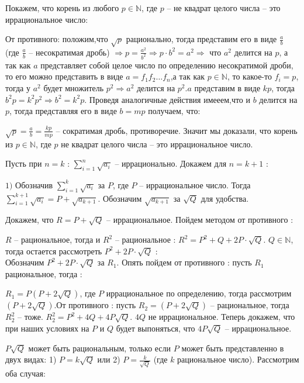 \documentclass[a4paper,14pt]{article} %
\begin{document}
Покажем, что корень из любого $p \in \mathbb{N}$, где $p$ -- не квадрат целого числа -- это иррациональное число:

От противного: положим,что $\sqrt{p}$ рационально, тогда представим его в виде $\frac{a}{b}$ (где $\frac{a}{b}$ -- несократимая дробь) $\Rightarrow p = \frac{a^2}{b^2} \Rightarrow p\cdot b^2 = a^2 \Rightarrow $ что $a^2$ делится на $p$, а так как $a$ представляет собой целое число по определению несократимой дроби, то его можно представить в виде $a = f_{1} f_{2}  \dots  f_{n}$,а так как $p \in \mathbb{N}$, то какое-то $f_{i} = p$, тогда у $a^2$ будет множитель $p^2 \Rightarrow a^2$ делится на $p^2$.$a$ представим в виде $kp$, тогда $b^2p = k^2p^2 \Rightarrow b^2=k^2p$. Проведя аналогичные действия имееем,что и $b$ делится на $p$, тогда  представляя его в виде $ b = mp$ получаем, что:

$ \sqrt{p} = \frac{a}{b} = \frac{kp}{mp}$ -- сократимая дробь, противоречие. Значит мы доказали, что корень из $p \in \mathbb{N}$, где $p$ не квадрат целого числа -- это иррациональное число.

Пусть при $n = k$ : $\sum\limits_{i=1}^{n} \sqrt{a_{i}}$ -- иррационально.
Докажем для $n = k + 1$ :

$1)$ Обозначив $\sum\limits_{i=1}^{k} \sqrt{a_{i}}$ за $P$, где $P$ -- иррациональное число. Тогда $\sum\limits_{i=1}^{k+1} \sqrt{a_{i}} = P + \sqrt{a_{k+1}}$. Обозначим $\sqrt{a_{k+1}}$ за $\sqrt{Q}$ для удобства.

Докажем, что $ R = P + \sqrt{Q}$ -- иррациональное. Пойдем методом от противного :

$R$ -- рациональное, тогда и $R^2$ -- рациональное : $R^2 = P^2 + Q + 2P\cdot \sqrt{Q}.$ $Q \in \mathbb{N}$, тогда остается рассмотреть $P^2 + 2P\cdot \sqrt{Q}$ :\\
Обозначим $P^2 + 2P\cdot \sqrt{Q}$ за $R_1$. Опять пойдем от противного : пусть $R_1$ рациональное, тогда :

$R_1= P(P+2\sqrt{Q})$, где $P$ иррациональное по определению, тогда рассмотрим $(P+2\sqrt{Q})$.От противного : пусть $R_2 = (P+2\sqrt{Q})$ -- рациональное, тогда $R_2^2$ -- тоже.
$R_2^2 = P^2 + 4Q + 4P\sqrt{Q}$. $4Q$ не иррациональное. Теперь докажем, что при наших условиях на $P$ и $Q$ будет выпоняться, что $4P\sqrt{Q}$ -- иррациональное.

$P\sqrt{Q}$ может быть рациональным, только если $P$ может быть представленно в двух видах: 1) $P = k\sqrt{Q}$  или 2) $P = \frac{k}{\sqrt{Q}}$ (где $k$ рациональное число). Рассмотрим оба случая:\\
\end{document}
